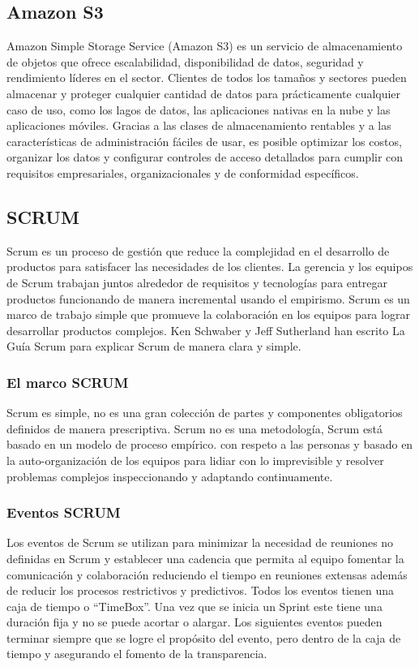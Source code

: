 \documentclass[a4paper, 12pt]{article}
\begin{document}
		\subsection{Amazon S3}
			Amazon Simple Storage Service (Amazon S3) es un servicio de almacenamiento de objetos que ofrece escalabilidad, disponibilidad de datos, seguridad y rendimiento líderes en el sector. Clientes de todos los tamaños y sectores pueden almacenar y proteger cualquier cantidad de datos para prácticamente cualquier caso de uso, como los lagos de datos, las aplicaciones nativas en la nube y las aplicaciones móviles. Gracias a las clases de almacenamiento rentables y a las características de administración fáciles de usar, es posible optimizar los costos, organizar los datos y configurar controles de acceso detallados para cumplir con requisitos empresariales, organizacionales y de conformidad específicos.
		\subsection{SCRUM}
			Scrum es un proceso de gestión que reduce la complejidad en el desarrollo de productos para satisfacer las necesidades de los clientes. La gerencia y los equipos de Scrum trabajan juntos alrededor de requisitos y tecnologías para entregar productos funcionando de manera incremental usando el empirismo.
			Scrum es un marco de trabajo simple que promueve la colaboración en los equipos para lograr desarrollar productos complejos. Ken Schwaber y Jeff Sutherland han escrito La Guía Scrum para explicar Scrum de manera clara y simple.
			\subsubsection{El marco SCRUM}
				Scrum es simple, no es una gran colección de partes y componentes obligatorios definidos de manera prescriptiva. Scrum no es una metodología, Scrum está basado en un modelo de proceso empírico. con respeto a las personas y basado en la auto-organización de los equipos para lidiar con lo imprevisible y resolver problemas complejos inspeccionando y adaptando
				continuamente.
			\subsubsection{Eventos SCRUM}
				Los eventos de Scrum se utilizan para minimizar la necesidad de reuniones no definidas en Scrum y establecer una cadencia que permita al equipo fomentar la comunicación y colaboración reduciendo el tiempo en reuniones extensas además de reducir los procesos restrictivos y predictivos. Todos los eventos tienen una caja de tiempo o “TimeBox”. Una vez que se inicia un Sprint este tiene una duración fija y no se puede acortar o alargar. Los siguientes
				eventos pueden terminar siempre que se logre el propósito del evento, pero dentro de la caja de tiempo y asegurando el fomento de la transparencia.
				
\end{document}
